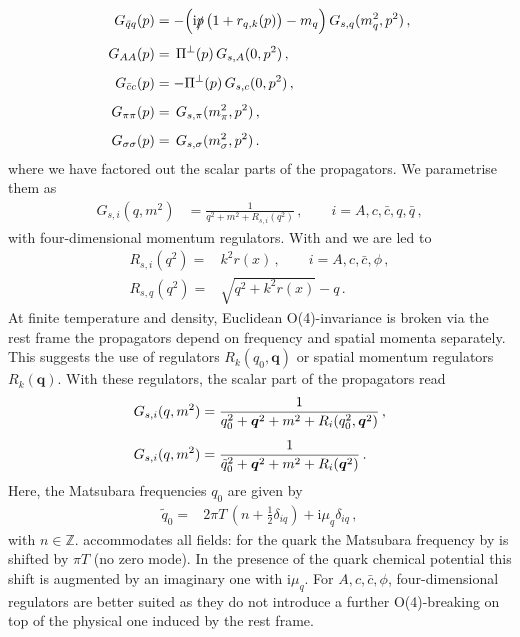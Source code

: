 \documentclass[aps,twocolumn,prd,superscriptaddress]{revtex4-2}
\begin{document}
\begin{align}
	G_{\bar qq}(p)     & = - \Big({\textrm{i}}\slashed{p}\,\big(1+r_{q,k}(p)\big) - m_q\Big)\, G_{s,q}(m_q^2, p^2)\,,
	\notag                                                                                      \\[1ex]
	G_{AA}(p)           & = \, \Pi^\perp(p)\,G_{s,A}(0, p^2)\,,
	\notag                                                                                      \\[1ex]
	G_{\bar{c}c}(p)     & = -\Pi^\perp(p)\,G_{s,c}(0, p^2)\,,
	\notag                                                                                      \\[1ex]
	G_{\pi\pi}(p)       & = \, G_{s,\pi}(m_\pi^2, p^2)\,,
	\notag                                                                                      \\[1ex]
	G_{\sigma\sigma}(p) & = \, G_{s,\sigma}(m_\sigma^2, p^2)\,.
	\label{eq:DefofProps}
\end{align}
%
where we have factored out the scalar parts  of the propagators. 
We parametrise them as
%
\begin{align}
	G_{s,i} (q, m^2) & = \frac{1}{q^2 + m^2 + R_{s,i}(q^2)} \,, \qquad i=A,c,\bar c,q,\bar q\,, 
\label{eq:ScalPProp}
\end{align}
% 
with four-dimensional momentum regulators. With	 and  we are led to 
%
\begin{align}\nonumber 
R_{s,i} (q^2)= & k^2 r(x)\,, \qquad i= A,c,\bar c ,\phi\,,\\[1ex]
R_{s,q} (q^2)= & \sqrt{q^2 +k^2 r(x)} -q\,.
\end{align}
%
At finite temperature and density, Euclidean O(4)-invariance is broken via the rest frame the propagators depend on frequency and spatial momenta separately. This suggests the use of regulators $R_k(q_0,\boldsymbol{q})$ or spatial momentum regulators $R_k(\boldsymbol{q})$. With these regulators, the scalar part of the propagators read 
%
\begin{align}
	G_{s,i} (q, m^2) & = \frac{1}{q_0^2 + \boldsymbol{q}^2 + m^2 + R_{i}(q_0^2, \boldsymbol{q}^2)} \,, \notag                                   \\[1ex]
	G_{s,i} (q, m^2) & = \frac{1}{\tilde q_0^2 + \boldsymbol{q}^2 + m^2 + R_{i}(\boldsymbol{q}^2)} \,.
\label{eq:ScalPPropT}
\end{align}
% 
Here, the Matsubara frequencies $q_0$ are given by 
%
\begin{align} 
\tilde q_0 =& 2 \pi T\,\left(n + \frac12 \delta_{iq} \right)+ \textrm{i} \mu_q\delta_{iq}\,,
\label{eq:tildeq0App}
\end{align}
%
with $n \in \mathbb{Z}$.  accommodates all fields: for the quark the Matsubara frequency by is shifted by $\pi T$ (no zero mode). In the presence of the quark chemical potential this shift is augmented by an imaginary one with $\textrm{i}\mu_q$. For $A,c,\bar c,\phi$, four-dimensional regulators are better suited as they do not introduce a further O(4)-breaking on top of the physical one induced by the rest frame. 
\end{document}
